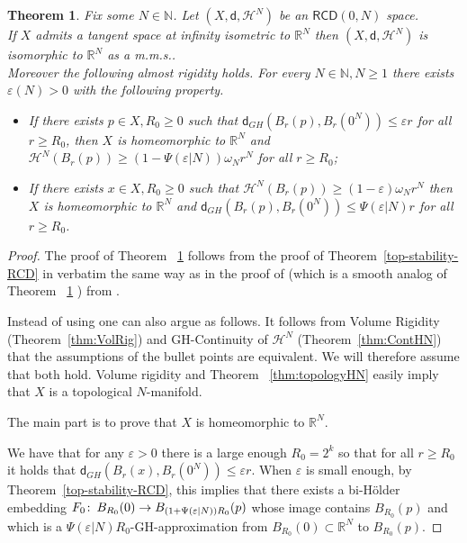 \documentclass[a4paper]{amsart}
\newcounter{assu}
\theoremstyle{plain}
\newtheorem{theorem}[lemma]{Theorem}
\theoremstyle{definition}
\numberwithin{equation}{section}
\newcommand{\R}{\mathbb{R}}
\newcommand{\N}{\mathbb{N}}
\newcommand{\RCD}{\mathsf{RCD}}
\newcommand{\sfd}{\mathsf d}
\newcommand{\cH}{\mathcal{H}}
\newcommand{\eps}{\varepsilon}
\def\co{\colon\thinspace}
\begin{document}
{\begin{theorem}\label{Thm:ConeInf}
Fix some  $N\in \N$. Let $(X,\sfd, \cH^{N})$ be an  $\RCD(0,N)$ space.
\\If $X$ admits a tangent space at infinity isometric  to $\R^{N}$ then $(X,\sfd, \cH^{N})$ is isomorphic to $\R^{N}$ as a m.m.s..
\\Moreover  the  following almost rigidity holds.  For every $N\in \N, N\geq 1$ there exists $\varepsilon(N)>0$ with the following property. 
\begin{itemize}
\item If there exists $p\in X, R_{0}\geq 0$ such that $\sfd_{GH}(B_{r}(p),B_{r}(0^{N}))\leq \varepsilon r$ for all $r\geq R_{0}$,  then $X$ is homeomorphic to $\R^{N}$ and $\cH^{N}(B_{r}(p))\geq (1-\Psi(\varepsilon|N))  \omega_{N} r^{N}$ for all $r\geq R_{0}$;
\item If there exists $x\in X, R_{0}\geq 0$ such that $\cH^{N}(B_{r}(p))\geq (1-\varepsilon)  \omega_{N} r^{N}$ then $X$ is homeomorphic to $\R^{N}$ and $\sfd_{GH}(B_{r}(p),B_{r}(0^{N}))\leq \Psi(\varepsilon|N)  r$ for all $r\geq R_{0}$.
\end{itemize}
\end{theorem}

\begin{proof}
The proof of Theorem ~\ref{Thm:ConeInf}  follows from the proof of Theorem~\ref{top-stability-RCD} in verbatim the same way as in the proof of \cite[Theorem  A.1.11]{CC97} (which is a smooth analog  of Theorem ~\ref{Thm:ConeInf} )  from \cite[Remark A.1.47]{CC97}.


Instead of using \cite[Remark A.1.47]{CC97} one can also argue as follows. It follows from Volume Rigidity (Theorem~\ref{thm:VolRig}) and GH-Continuity of $\cH^{N}$ (Theorem~\ref{thm:ContHN}) that the assumptions of the bullet  points are equivalent. We will therefore assume that both hold.
Volume rigidity and Theorem ~\ref{thm:topologyHN} easily imply that $X$ is a topological $N$-manifold.


The main part is to prove that $X$ is homeomorphic to $\R^N$. 



  We have that for any $\eps>0$  there is a large enough $R_0=2^k$ so that for all $r\ge R_0$ it holds that $\sfd_{GH}(B_{r}(x),B_{r}(0^{N}))\leq \eps r$. When $\eps$ is small enough, by Theorem~\ref{top-stability-RCD}, this implies that there exists a bi-H\"older embedding $F_0\co B_{R_0}(0)\to  B_{(1+\Psi(\eps|N))R_0}(p)$   whose image contains  $B_{R_0}(p)$ and which is a $\Psi(\eps|N)R_0$-GH-approximation from  $B_{R_0}(0)\subset \R^N$ to $ B_{R_0}(p)$. 


\end{proof}}
\end{document}
